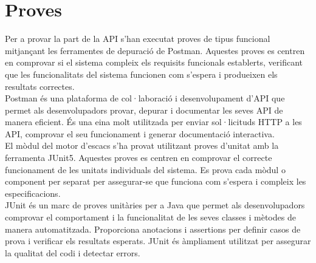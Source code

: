 \section{Proves}
Per a provar la part de la API s'han executat proves de tipus funcional mitjançant les ferramentes de depuració de Postman. Aquestes proves es centren en comprovar si el sistema compleix els requisits funcionals establerts, verificant que les funcionalitats del sistema funcionen com s'espera i produeixen els resultats correctes.
\\[3mm]
Postman és una plataforma de col·laboració i desenvolupament d'API que permet als desenvolupadors provar, depurar i documentar les seves API de manera eficient. És una eina molt utilitzada per enviar sol·licituds HTTP a les API, comprovar el seu funcionament i generar documentació interactiva.
\\[3mm]
El mòdul del motor d'escacs s'ha provat utilitzant proves d'unitat amb la ferramenta JUnit5. Aquestes proves es centren en comprovar el correcte funcionament de les unitats individuals del sistema. Es prova cada mòdul o component per separat per assegurar-se que funciona com s'espera i compleix les especificacions.
\\[3mm]
JUnit és un marc de proves unitàries per a Java que permet als desenvolupadors comprovar el comportament i la funcionalitat de les seves classes i mètodes de manera automatitzada. Proporciona anotacions i assertions per definir casos de prova i verificar els resultats esperats. JUnit és àmpliament utilitzat per assegurar la qualitat del codi i detectar errors.

